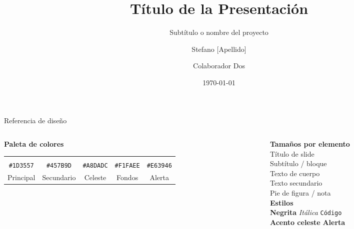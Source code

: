 \documentclass[aspectratio=169, 11pt]{beamer}
\title{Título de la Presentación}
\subtitle{Subtítulo o nombre del proyecto}
\author{Stefano [Apellido] \and Colaborador Dos}
\institute{%
  Departamento de Química \\
  Universidad / Centro de Investigación \\
  {\small\texttt{correo@institucion.cl}}
}
\date{\today}
\begin{document}

\maketitle

\begin{frame}{Referencia de diseño}
  \begin{columns}[T]

    \begin{column}{0.55\textwidth}
      {\large\textbf{Paleta de colores}}\\[0.8em]

      \begin{tabular}{ccccc}
        \colorbox{cAzulOscuro}{\rule{0pt}{1.2em}\hspace{2.2em}} &
        \colorbox{cAzulMedio}{\rule{0pt}{1.2em}\hspace{2.2em}} &
        \colorbox{cCeleste}{\rule{0pt}{1.2em}\hspace{2.2em}} &
        \colorbox{cBlancoHumo}{\rule{0pt}{1.2em}\hspace{2.2em}} &
        \colorbox{cRojo}{\rule{0pt}{1.2em}\hspace{2.2em}} \\[0.3em]
        {\tiny\texttt{\#1D3557}} &
        {\tiny\texttt{\#457B9D}} &
        {\tiny\texttt{\#A8DADC}} &
        {\tiny\texttt{\#F1FAEE}} &
        {\tiny\texttt{\#E63946}} \\[0.2em]
        {\tiny Principal} &
        {\tiny Secundario} &
        {\tiny Celeste} &
        {\tiny Fondos} &
        {\tiny Alerta} \\
      \end{tabular}
    \end{column}

    \begin{column}{0.42\textwidth}
      {\large\textbf{Tamaños por elemento}}\\[0.5em]
      {\LARGE Título de slide}\\[0.2em]
      {\Large Subtítulo / bloque}\\[0.2em]
      {\normalsize Texto de cuerpo}\\[0.2em]
      {\small Texto secundario}\\[0.2em]
      {\footnotesize Pie de figura / nota}\\[0.8em]

      {\large\textbf{Estilos}}\\[0.4em]
      \textbf{Negrita}\quad
      \textit{Itálica}\quad
      \texttt{Código}\\[0.3em]
      \textcolor{cCeleste}{\textbf{Acento celeste}}\quad
      \alert{\textbf{Alerta}}\\
    \end{column}

  \end{columns}
\end{frame}
\end{document}
